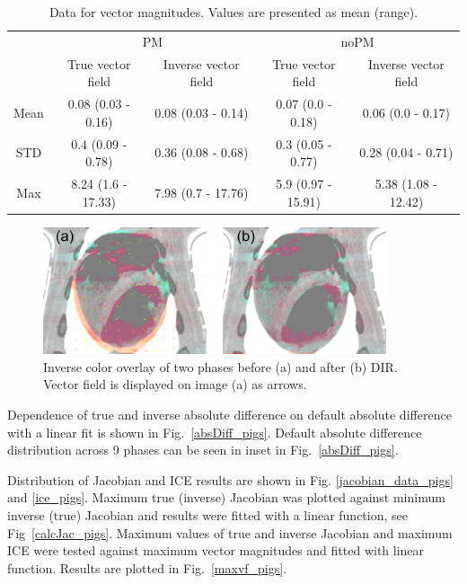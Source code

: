 \documentclass[type=dr, dr=rernat, accentcolor=tud7b,colorbacktitle, bigchapter, openright, twoside, 12pt ]{tudthesis}
\begin{document}
\begin{table}[H]
  \centering
  \caption{Data for vector magnitudes. Values are presented as mean (range).}
  \begin{tabular}{c|c|c|c|c}
	    & \multicolumn{2}{|c|}{PM} & \multicolumn{2}{|c}{noPM} \\
  
            & True vector field   & Inverse vector field   & True vector field  & Inverse vector field \\
       \hline
	Mean & 0.08 (0.03 - 0.16) & 0.08 (0.03 - 0.14) & 0.07 (0.0 - 0.18)  & 0.06 (0.0 - 0.17) \\ 
	STD  & 0.4 (0.09 - 0.78)  & 0.36 (0.08 - 0.68) & 0.3 (0.05 - 0.77)  & 0.28 (0.04 - 0.71) \\ 
	Max  & 8.24 (1.6 - 17.33) & 7.98 (0.7 - 17.76) & 5.9 (0.97 - 15.91) & 5.38 (1.08 - 12.42) \\ 
    \hline\hline
  \end{tabular}
  \label{tab:vectordata_pig}
\end{table}

\begin{figure}[H]
	\begin{center}		
		\includegraphics[width=0.9\textwidth]{./Images/exampleReg_pigs.png}
		\caption{Inverse color overlay of two phases before (a) and after (b) DIR. Vector field is displayed on image (a) as arrows.}
		\label{exampleReg_pigs}
	\end{center}
\end{figure}

Dependence of true and inverse absolute difference on default absolute difference with a linear fit is shown in Fig.~\ref{absDiff_pigs}. Default absolute difference distribution across 9 phases can be seen in inset in Fig.~\ref{absDiff_pigs}.

Distribution of Jacobian and ICE results are shown in Fig. \ref{jacobian_data_pigs} and \ref{ice_pigs}. Maximum true (inverse) Jacobian was plotted against minimum inverse (true) Jacobian and results were fitted with a linear function, see Fig~\ref{calcJac_pigs}. Maximum values of true and inverse Jacobian and maximum ICE were tested against maximum vector magnitudes and fitted with linear function. Results are plotted in Fig.~\ref{maxvf_pigs}.
\end{document}
